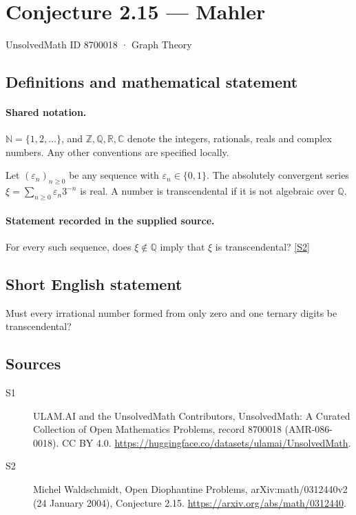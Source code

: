 \documentclass[11pt]{article}
\newcommand{\sref}[2]{\hyperlink{source:#1:#2}{[S#2]}}
\begin{document}
\setcounter{section}{8700017}
\section{Conjecture 2.15 — Mahler}\label{8700018}
{\small\sffamily UnsolvedMath ID 8700018 · Graph Theory}
\subsection{Definitions and mathematical statement}

\paragraph{Shared notation.}$\mathbb N=\{1,2,\ldots\}$, and $\mathbb Z,\mathbb Q,\mathbb R,\mathbb C$ denote the integers, rationals, reals and complex numbers. Any other conventions are specified locally.


Let $(\varepsilon_n)_{n\ge0}$ be any sequence with $\varepsilon_n\in\{0,1\}$. The absolutely convergent series $\xi=\sum_{n\ge0}\varepsilon_n3^{-n}$ is real. A number is transcendental if it is not algebraic over $\mathbb Q$.
\paragraph{Statement recorded in the supplied source.}
For every such sequence, does $\xi\notin\mathbb Q$ imply that $\xi$ is transcendental? \sref{8700018}{2}
\subsection{Short English statement}
Must every irrational number formed from only zero and one ternary digits be transcendental?
\subsection{Sources}
\begin{description}
\item[\hypertarget{source:8700018:1}{S1}] ULAM.AI and the UnsolvedMath Contributors, UnsolvedMath: A Curated Collection of Open Mathematics Problems, record 8700018 (AMR-086-0018). CC BY 4.0. \url{https://huggingface.co/datasets/ulamai/UnsolvedMath}.
\item[\hypertarget{source:8700018:2}{S2}] Michel Waldschmidt, Open Diophantine Problems, arXiv:math/0312440v2 (24 January 2004), Conjecture 2.15. \url{https://arxiv.org/abs/math/0312440}.
\end{description}
\label{end:8700018}
\end{document}
